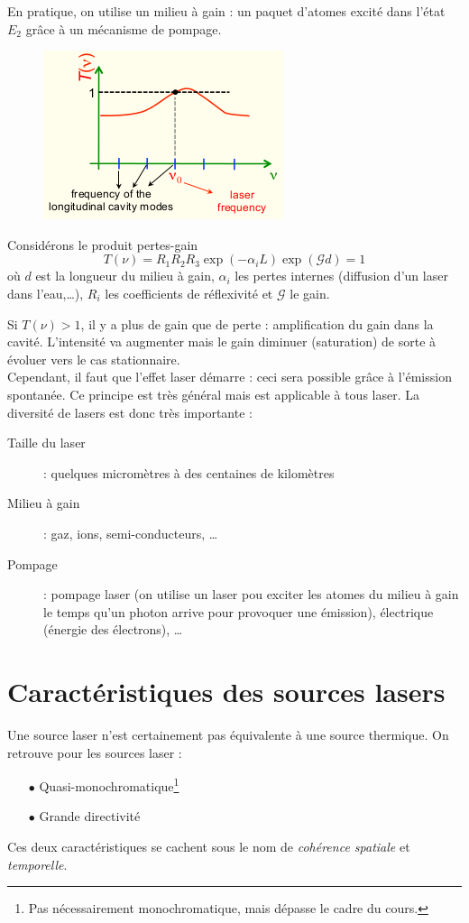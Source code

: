 	En pratique, on utilise un milieu à gain : un paquet d'atomes excité dans l'état $E_2$ grâce à un mécanisme 
	de pompage.\\
	
	\begin{figure}
	\vspace{-5mm}
	\includegraphics[scale=0.65]{ch1/image5.png}
	\end{figure}
	Considérons le produit pertes-gain
	\begin{equation}
	T(\nu) = R_1R_2R_3\exp(-\alpha_iL)\exp(\mathcal{G}d) =1
	\end{equation}
	où $d$ est la longueur du milieu à gain, $\alpha_i$ les pertes internes (diffusion d'un laser dans l'eau,\dots),
	$R_i$ les coefficients de réflexivité et $\mathcal{G}$ le gain.
	
	Si $T(\nu) > 1$, il y a plus de gain que de perte : amplification du gain dans la cavité. L'intensité va 
	augmenter mais le gain diminuer (saturation) de sorte à évoluer vers le cas stationnaire.\\
	
	Cependant, il faut que l'effet laser démarre : ceci sera possible grâce à l'émission spontanée. Ce principe 
	est très général mais est applicable à tous laser. La diversité de lasers est donc très importante :
	\begin{description}
	\item[Taille du laser] : quelques micromètres à des centaines de kilomètres
	\item[Milieu à gain] : gaz, ions, semi-conducteurs, \dots
	\item[Pompage] : pompage laser (on  utilise un laser pou exciter les atomes du milieu à gain le temps qu'un 
	photon arrive pour provoquer une émission), électrique (énergie des électrons), \dots
	\end{description}


	\section{Caractéristiques des sources lasers}
	Une source laser n'est certainement pas équivalente à une source thermique. On retrouve pour les sources 
	laser :
	\begin{itemize}
	\item[$\bullet$] Quasi-monochromatique\footnote{Pas nécessairement monochromatique, mais dépasse le cadre 
	du cours.}
	\item[$\bullet$] Grande directivité
	\end{itemize}
	Ces deux caractéristiques se cachent sous le nom de \textit{cohérence spatiale} et \textit{temporelle}. 
	
